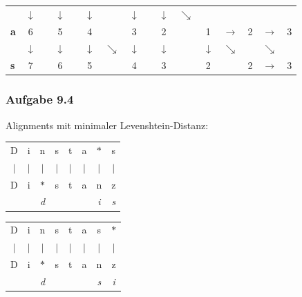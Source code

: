 \documentclass{beamer}
\begin{document}
\begin{frame}
\begin{tabular}{l|ccccccccccccccc}
				& $\downarrow$ &       & $\downarrow$ &       & $\downarrow$ &       & $\downarrow$ &       & $\downarrow$ & $\searrow$ &       &       &       &       &  \\
				\textbf{a}     & 6     &       & 5     &       & 4     &       & 3     &       & 2     &       & 1     & $\rightarrow$ & 2     & $\rightarrow$ & 3 \\
				& $\downarrow$ &       & $\downarrow$ &       & $\downarrow$ & $\searrow$ & $\downarrow$ &       & $\downarrow$ &       & $\downarrow$ & $\searrow$ &       & $\searrow$ &  \\
				\textbf{s}     & 7     &       & 6     &       & 5     &       & 4     &       & 3     &       & 2     &       & 2     & $\rightarrow$ & 3 \\
			\end{tabular}
\end{frame}

\begin{frame} \frametitle{Aufgabe 9.4}
	Alignments mit minimaler Levenshtein-Distanz:
	
	\centering
	
	\begin{tabular}{cccccccc}
		D & i & n & s & t & a & $\ast$ & s \\
		$|$ & $|$ & $|$ & $|$ & $|$ & $|$ & $|$ & $|$ \\
		D & i & $\ast$ & s & t & a & n & z \\
		  &   & \textit{d} &   &   &   & \textit{i} & \textit{s} \\
	\end{tabular}

	\vspace{3em}
	
	\begin{tabular}{cccccccc}
		D & i & n & s & t & a & s & $\ast$ \\
		$|$ & $|$ & $|$ & $|$ & $|$ & $|$ & $|$ & $|$ \\
		D & i & $\ast$ & s & t & a & n & z \\
		&   & \textit{d} &   &   &   & \textit{s} & \textit{i} \\
	\end{tabular}
\end{frame}
\end{document}
